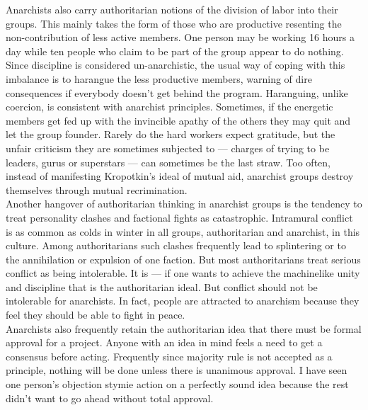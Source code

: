 \documentclass[12pt, onecolumn, letterpaper, oneside]{book}
\begin{document}
Anarchists also carry authoritarian notions of the division of labor into their groups. This mainly takes the form of those who are productive resenting the non-contribution of less active members. One person may be working 16 hours a day while ten people who claim to be part of the group appear to do nothing. Since discipline is considered un-anarchistic, the usual way of coping with this imbalance is to harangue the less productive members, warning of dire consequences if everybody doesn't get behind the program. Haranguing, unlike coercion, is consistent with anarchist principles. Sometimes, if the energetic members get fed up with the invincible apathy of the others they may quit and let the group founder. Rarely do the hard workers expect gratitude, but the unfair criticism they are sometimes subjected to --- charges of trying to be leaders, gurus or superstars --- can sometimes be the last straw. Too often, instead of manifesting Kropotkin's ideal of mutual aid, anarchist groups destroy themselves through mutual recrimination.\\
Another hangover of authoritarian thinking in anarchist groups is the tendency to treat personality clashes and factional fights as catastrophic. Intramural conflict is as common as colds in winter in all groups, authoritarian and anarchist, in this culture. Among authoritarians such clashes frequently lead to splintering or to the annihilation or expulsion of one faction. But most authoritarians treat serious conflict as being intolerable. It is --- if one wants to achieve the machinelike unity and discipline that is the authoritarian ideal. But conflict should not be intolerable for anarchists. In fact, people are attracted to anarchism because they feel they should be able to fight in peace.\\
Anarchists also frequently retain the authoritarian idea that there must be formal approval for a project. Anyone with an idea in mind feels a need to get a consensus before acting. Frequently since majority rule is not accepted as a principle, nothing will be done unless there is unanimous approval. I have seen one person's objection stymie action on a perfectly sound idea because the rest didn't want to go ahead without total approval.\\
\end{document}
